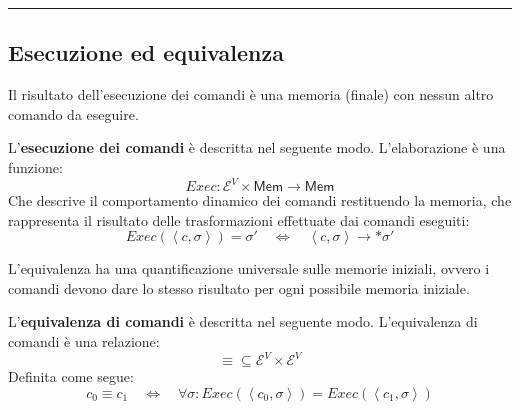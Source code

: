 \documentclass[a4paper]{article}
\newcommand{\longline}{\noindent\rule{\textwidth}{0.4pt}}
\begin{document}
 	\longline
 	
 	\subsection{Esecuzione ed equivalenza}
 	
 	Il risultato dell'esecuzione dei comandi è una memoria (finale) con nessun altro comando da eseguire.
 	
 	\begin{boxdef}
 		L'\textcolor{Red3}{\textbf{esecuzione dei comandi}} è descritta nel seguente modo. L'elaborazione è una funzione:
 		\begin{equation*}
 			Exec: \mathcal{E}^{V} \times \mathsf{Mem} \longrightarrow \mathsf{Mem}
 		\end{equation*}
 		Che descrive il comportamento dinamico dei comandi restituendo la memoria, che rappresenta il risultato delle trasformazioni effettuate dai comandi eseguiti:
 		\begin{equation*}
 			Exec\left(\left\langle c,\sigma \right\rangle\right) = \sigma' \hspace{1em} \iff \hspace{1em} \left\langle c,\sigma \right\rangle \longrightarrow* \sigma'
 		\end{equation*}
 	\end{boxdef}
 	
 	\noindent
 	L'equivalenza ha una quantificazione universale sulle memorie iniziali, ovvero i comandi devono dare lo stesso risultato per ogni possibile memoria iniziale.
 	
 	\begin{boxdef}
 		L'\textcolor{Red3}{\textbf{equivalenza di comandi}} è descritta nel seguente modo. L'equivalenza di comandi è una relazione:
 		\begin{equation*}
 			\equiv \subseteq \mathcal{E}^{V} \times \mathcal{E}^{V}
 		\end{equation*}
 		Definita come segue:
 		\begin{equation*}
 			c_{0} \equiv c_{1} \hspace{1em} \iff \hspace{1em} \forall\sigma : Exec\left(\left\langle c_{0}, \sigma \right\rangle\right) = Exec\left(\left\langle c_{1}, \sigma \right\rangle\right)
 		\end{equation*}
 	\end{boxdef}
\end{document}
